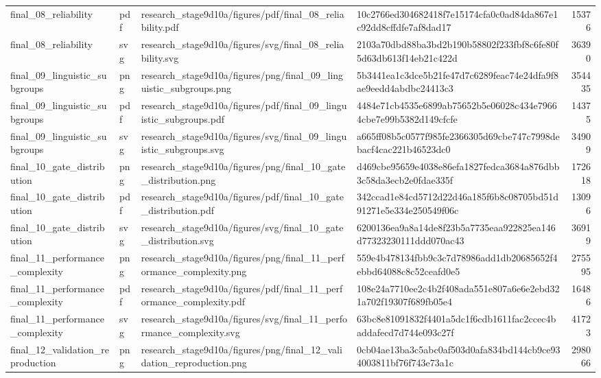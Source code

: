 \begin{tabular}{llllr}
final\_08\_reliability & pdf & research\_stage9d10a/figures/pdf/final\_08\_reliability.pdf & 10c2766ed304682418f7e15174cfa0c0ad84da867e1c92dd8cffdfe7af8dad17 & 15376 \\
final\_08\_reliability & svg & research\_stage9d10a/figures/svg/final\_08\_reliability.svg & 2103a70dbd88ba3bd2b190b58802f233fbf8c6fe80f5d63db613f14eb21c422d & 36390 \\
final\_09\_linguistic\_subgroups & png & research\_stage9d10a/figures/png/final\_09\_linguistic\_subgroups.png & 5b3441ea1c3dce5b21fe47d7c6289feac74e24dfa9f8ae9eedd4abdbc24413c3 & 354435 \\
final\_09\_linguistic\_subgroups & pdf & research\_stage9d10a/figures/pdf/final\_09\_linguistic\_subgroups.pdf & 4484e71cb4535e6899ab75652b5e06028c434e79664cbe7e99b5382d149cfcfe & 14375 \\
final\_09\_linguistic\_subgroups & svg & research\_stage9d10a/figures/svg/final\_09\_linguistic\_subgroups.svg & a665ff08b5c0577f985fe2366305d69cbe747c7998debacf4cac221b46523dc0 & 34909 \\
final\_10\_gate\_distribution & png & research\_stage9d10a/figures/png/final\_10\_gate\_distribution.png & d469cbe95659e4038e86efa1827fedca3684a876dbb3c58da3ecb2e0fdae335f & 172618 \\
final\_10\_gate\_distribution & pdf & research\_stage9d10a/figures/pdf/final\_10\_gate\_distribution.pdf & 342ccad1e84cd5712d22d46a185f6b8c08705bd51d91271e5e334e250549f06c & 13096 \\
final\_10\_gate\_distribution & svg & research\_stage9d10a/figures/svg/final\_10\_gate\_distribution.svg & 6200136ea9a8a14de8f23b5a7735eaa922825ea146d77323230111ddd070ac43 & 36919 \\
final\_11\_performance\_complexity & png & research\_stage9d10a/figures/png/final\_11\_performance\_complexity.png & 559e4b478134fbb9c3c7d78986add1db20685652f4ebbd64088c8c52ceafd0e5 & 275595 \\
final\_11\_performance\_complexity & pdf & research\_stage9d10a/figures/pdf/final\_11\_performance\_complexity.pdf & 108e24a7710ee2c4b2f408ada551e807a6e6e2ebd321a702f19307f689fb05e4 & 16486 \\
final\_11\_performance\_complexity & svg & research\_stage9d10a/figures/svg/final\_11\_performance\_complexity.svg & 63bc8e81091832f4401a5dc1f6cdb1611fac2ccec4baddafecd7d744e093c27f & 41723 \\
final\_12\_validation\_reproduction & png & research\_stage9d10a/figures/png/final\_12\_validation\_reproduction.png & 0cb04ae13ba3c5abc0af503d0afa834bd144cb9ce934003811bf76f743e73a1c & 298066 \\

\end{tabular}
